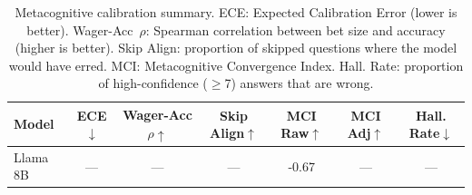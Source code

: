 \begin{table}[ht]
\centering
\caption{Metacognitive calibration summary. ECE: Expected Calibration Error
  (lower is better). Wager-Acc~$\rho$: Spearman correlation between bet size
  and accuracy (higher is better). Skip Align: proportion of skipped questions
  where the model would have erred. MCI: Metacognitive Convergence Index.
  Hall. Rate: proportion of high-confidence ($\geq$7) answers that are wrong.}
\label{tab:calibration}
\begin{tabular}{lcccccc}
\toprule
Model & ECE$\downarrow$ & Wager-Acc $\rho\uparrow$ & Skip Align$\uparrow$ & MCI Raw$\uparrow$ & MCI Adj$\uparrow$ & Hall. Rate$\downarrow$ \\
\midrule
        Llama 8B & — & — & — & -0.67 & — & — \\
\bottomrule
\end{tabular}
\end{table}
